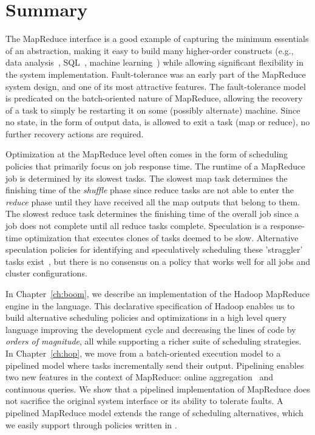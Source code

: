 \section{Summary}
\label{ch:hadoop:sec:conclude}

The MapReduce interface is a good example of capturing the minimum essentials
of an abstraction, making it easy to build many higher-order constructs (e.g.,
data analysis~\cite{pig-sigmod}, SQL~\cite{hive-vldb}, machine
learning~\cite{mahout}) while allowing significant flexibility in the system
implementation.  Fault-tolerance was an early part of the MapReduce system
design, and one of its most attractive features.  The fault-tolerance model is
predicated on the batch-oriented nature of MapReduce, allowing the recovery of
a task to simply be restarting it on some (possibly alternate) machine.  Since
no state, in the form of output data, is allowed to exit a task (map or
reduce), no further recovery actions are required.

Optimization at the MapReduce level often comes in the form of scheduling
policies that primarily focus on job response time.  The runtime of a MapReduce
job is determined by its slowest tasks.  The slowest map task determines the
finishing time of the {\em shuffle} phase since reduce tasks are not able to
enter the {\em reduce} phase until they have received all the map outputs that
belong to them.  The slowest reduce task determines the finishing time of the
overall job since a job does not complete until all reduce tasks complete.
Speculation is a response-time optimization that executes clones of tasks
deemed to be slow.  Alternative speculation policies for identifying and
speculatively scheduling these 'straggler' tasks exist~\cite{mapreduce-osdi,
zaharia-late}, but there is no consensus on a policy that works well for all
jobs and cluster configurations.

In Chapter~\ref{ch:boom}, we describe an implementation of the Hadoop MapReduce
engine in the \OVERLOG language.  This declarative specification of Hadoop
enables us to build alternative scheduling policies and optimizations in a high
level query language improving the development cycle and decreasing the lines
of code by {\em orders of magnitude}, all while supporting a richer suite of
scheduling strategies.  In Chapter~\ref{ch:hop}, we move from a batch-oriented
execution model to a pipelined model where tasks incrementally send their
output.  Pipelining enables two new features in the context of MapReduce:
online aggregation~\cite{onlineagg} and continuous queries.  We show that a
pipelined implementation of MapReduce does not sacrifice the original system
interface or its ability to tolerate faults.  A pipelined MapReduce model
extends the range of scheduling alternatives, which we easily support through
policies written in \OVERLOG.

